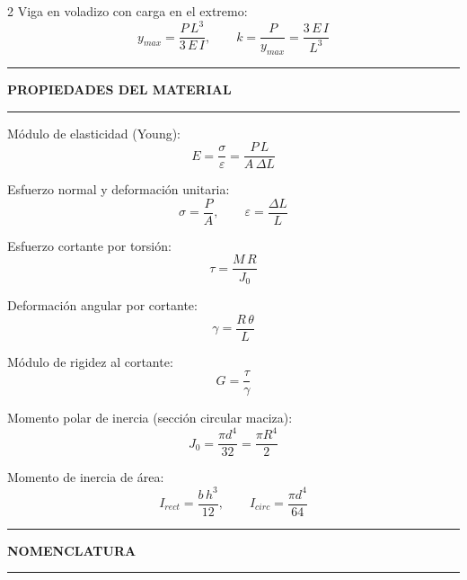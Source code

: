\documentclass[10pt,a4paper]{article}
\newcommand{\seccion}[1]{%
  \vspace{2mm}\hrule\vspace{1mm}%
  \textbf{\footnotesize\MakeUppercase{#1}}\vspace{1mm}\hrule\vspace{2mm}}
\begin{document}
\begin{multicols}{2}
Viga en voladizo con carga en el extremo:
\begin{equation*}
  y_{max} = \frac{P\,L^{3}}{3\,E\,I},
  \qquad
  k = \frac{P}{y_{max}} = \frac{3\,E\,I}{L^{3}}
\end{equation*}

\seccion{Propiedades del material}

Módulo de elasticidad (Young):
\begin{equation*}
  E = \frac{\sigma}{\varepsilon} = \frac{P\,L}{A\,\Delta L}
\end{equation*}

Esfuerzo normal y deformación unitaria:
\begin{equation*}
  \sigma = \frac{P}{A},
  \qquad
  \varepsilon = \frac{\Delta L}{L}
\end{equation*}

Esfuerzo cortante por torsión:
\begin{equation*}
  \tau = \frac{M\,R}{J_0}
\end{equation*}

Deformación angular por cortante:
\begin{equation*}
  \gamma = \frac{R\,\theta}{L}
\end{equation*}

Módulo de rigidez al cortante:
\begin{equation*}
  G = \frac{\tau}{\gamma}
\end{equation*}

Momento polar de inercia (sección circular maciza):
\begin{equation*}
  J_0 = \frac{\pi d^{4}}{32} = \frac{\pi R^{4}}{2}
\end{equation*}

Momento de inercia de área:
\begin{equation*}
  I_{rect} = \frac{b\,h^{3}}{12},
  \qquad
  I_{circ} = \frac{\pi d^{4}}{64}
\end{equation*}

\seccion{Nomenclatura}


\end{multicols}
\end{document}
